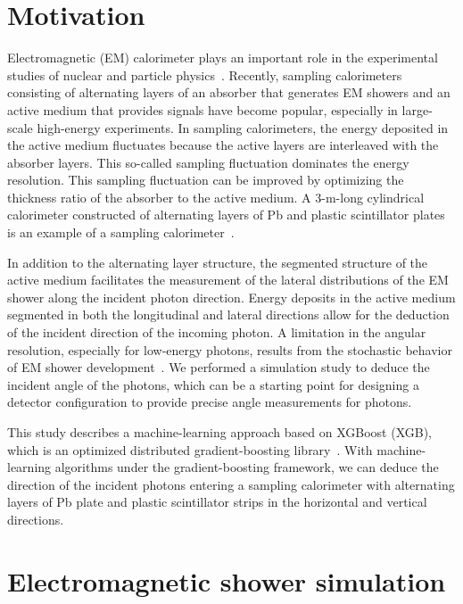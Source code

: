 \documentclass[preprint,12pt,times,a4paper]{elsarticle}
\begin{document}
\section{Motivation}
\label{sec:mot}
Electromagnetic (EM) calorimeter plays an important role in the experimental studies of nuclear and particle physics~\cite{KOTO:MB, CMS:EMCAL, BELLE:EMCAL}. Recently, sampling calorimeters consisting of alternating layers of an absorber that generates EM showers and an active medium that provides signals have become popular, especially in large-scale high-energy experiments. In sampling calorimeters, the energy deposited in the active medium fluctuates because the active layers are interleaved with the absorber layers. This so-called sampling fluctuation dominates the energy resolution. This sampling fluctuation can be improved by optimizing the thickness ratio of the absorber to the active medium. A 3-m-long cylindrical calorimeter constructed of alternating layers of Pb and plastic scintillator plates is an example of a sampling calorimeter~\cite{Murayama:2020mcp}.

In addition to the alternating layer structure, the segmented structure of the active medium facilitates the measurement of the lateral distributions of the EM shower along the incident photon direction. Energy deposits in the active medium segmented in both the longitudinal and lateral directions allow for the deduction of the incident direction of the incoming photon. A limitation in the angular resolution, especially for low-energy photons, results from the stochastic behavior of EM shower development~\cite{trk:ref}. We performed a simulation study to deduce the incident angle of the photons, which can be a starting point for designing a detector configuration to provide precise angle measurements for photons.

This study describes a machine-learning approach based on XGBoost (XGB), which is an optimized distributed gradient-boosting library~\cite{xgboost:2016}. With machine-learning algorithms under the gradient-boosting framework, we can deduce the direction of the incident photons entering a sampling calorimeter with alternating layers of Pb plate and plastic scintillator strips in the horizontal and vertical directions.

\section{Electromagnetic shower simulation}
\label{sec:ems}
\end{document}
